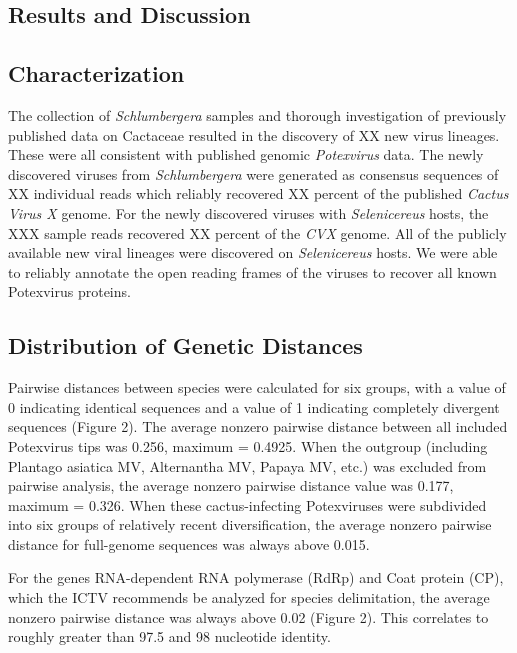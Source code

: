 \documentclass[11pt,letterpaper,titlepage]{article}
\begin{document}
\begin{linenumbers}
\section*{Results and Discussion}
\subsection*{Characterization}
The collection of \textit{Schlumbergera} samples and thorough investigation of previously published data on Cactaceae resulted in the discovery of XX new virus lineages.
These were all consistent with published genomic \textit{Potexvirus} data.
The newly discovered viruses from \textit{Schlumbergera} were generated as consensus sequences of XX individual reads which reliably recovered XX percent of the published\textit{ Cactus Virus X }genome. 
For the newly discovered viruses with \textit{Selenicereus} hosts, the XXX sample reads recovered XX percent of the \textit{CVX} genome.
All of the publicly available new viral lineages were discovered on \textit{Selenicereus} hosts.
We were able to reliably annotate the open reading frames of the viruses to recover all known Potexvirus proteins.

\subsection*{Distribution of Genetic Distances}
Pairwise distances between species were calculated for six groups, with a value of 0 indicating identical sequences and a value of 1 indicating completely divergent sequences (Figure 2). 
The average nonzero pairwise distance between all included Potexvirus tips was 0.256, maximum = 0.4925. 
When the outgroup (including Plantago asiatica MV, Alternantha MV, Papaya MV, etc.) was excluded from pairwise analysis, the average nonzero pairwise distance value was 0.177, maximum = 0.326. 
When these cactus-infecting Potexviruses were subdivided into six groups of relatively recent diversification, the average nonzero pairwise distance for full-genome sequences was always above 0.015. 

For the genes RNA-dependent RNA polymerase (RdRp) and Coat protein (CP), which the ICTV recommends be analyzed for species delimitation, the average nonzero pairwise distance was always  above 0.02 (Figure 2). 
This correlates to roughly greater than 97.5 and 98 nucleotide identity. 



\end{linenumbers}
\end{document}
